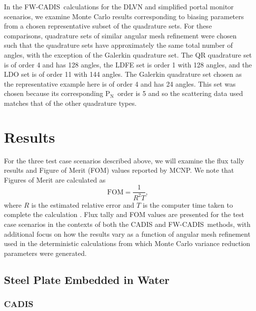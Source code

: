 \documentclass{article} %
\newcommand{\pn}{P$_\mathrm{N}$}
\newcommand{\fwc}{\mbox{FW-CADIS}}
\begin{document}
In the \fwc\ calculations for the DLVN and simplified portal monitor scenarios,
we examine Monte Carlo results corresponding to biasing parameters from a
chosen representative subset of the quadrature sets.
For these comparisons, quadrature sets of similar angular mesh
refinement were chosen such that the quadrature sets have approximately the 
same total number of angles, with the exception of the Galerkin quadrature set.
The QR quadrature set is of order 4 and has 128 angles, the LDFE set is order 1
with 128 angles, and the LDO set is of order 11 with 144 angles. 
The Galerkin quadrature set chosen as the representative example here is of
order 4 and has 24 angles. This set was chosen because its corresponding \pn\
order is 5 and so the scattering data used matches that of the other quadrature
types. 

\section{Results}
\label{sec:results}

For the three test case scenarios described above, we will examine the flux
tally results and Figure of Merit (FOM) values reported by MCNP. We note that
Figures of Merit are calculated as
%
\begin{equation}
\text{FOM} = \frac{1}{R^2T},
\label{eq:fom}
\end{equation}
%
where $R$ is the estimated relative error and $T$ is the computer
time taken to complete the calculation \cite{mcnp}. Flux tally and FOM values
are presented for the test case scenarios in the contexts of both the CADIS and
\fwc\ methods, with additional focus on how the results vary as a function of
angular mesh refinement used in the deterministic calculations from which Monte
Carlo variance reduction parameters were generated.

\subsection{Steel Plate Embedded in Water}

\subsubsection{CADIS}
\end{document}
